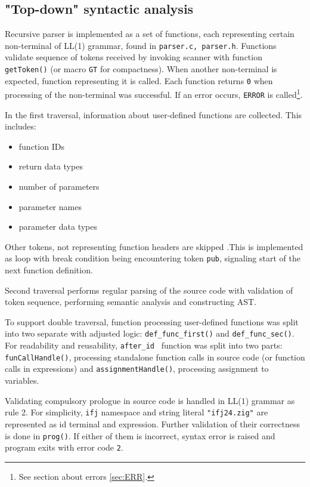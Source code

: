 \documentclass[a4paper, 11pt]{article}
\begin{document}
\subsection{"Top-down" syntactic analysis}\label{sec:PARSER}
Recursive parser is implemented as a set of functions, each representing certain non-terminal of LL(1) grammar, found in
\verb|parser.c, parser.h|.
Functions validate sequence of tokens received by invoking scanner with function \verb|getToken()| (or macro \verb|GT| for 
compactness). When another non-terminal is expected, function representing it is called.
Each function returns \verb|0| when processing of the non-terminal was successful. If an error occurs, \verb|ERROR| is called\footnote{See section
about errors \ref{sec:ERR}.}.
\par
In the first traversal, information about user-defined functions are collected. This includes:
\begin{itemize}
\item function IDs
\item return data types
\item number of parameters
\item parameter names 
\item parameter data types
\end{itemize}
Other tokens, not representing function headers are skipped 
.This is implemented as loop with break condition being encountering token \verb|pub|, signaling start of the next function definition.
\par
Second traversal performs regular parsing of the source code with validation of token sequence, performing semantic analysis and constructing
AST.
\par
To support double traversal, function processing user-defined functions was split into two separate with 
adjusted logic: \verb|def_func_first()| and \verb|def_func_sec()|. For readability and reusability, \verb|after_id|~
function was split into two parts: \verb|funCallHandle()|, processing standalone function calls in source code (or function calls 
in expressions) and \verb|assignmentHandle()|, processing assignment to variables.
\par
Validating compulsory prologue in source code is handled in LL(1) grammar as rule 2. For simplicity, 
\verb|ifj| namespace and string literal \verb|"ifj24.zig"| are represented as id terminal and expression.
Further validation of their correctness is done in \verb|prog()|. If either of them is incorrect, syntax error
is raised and program exits with error code \verb|2|.
\end{document}
